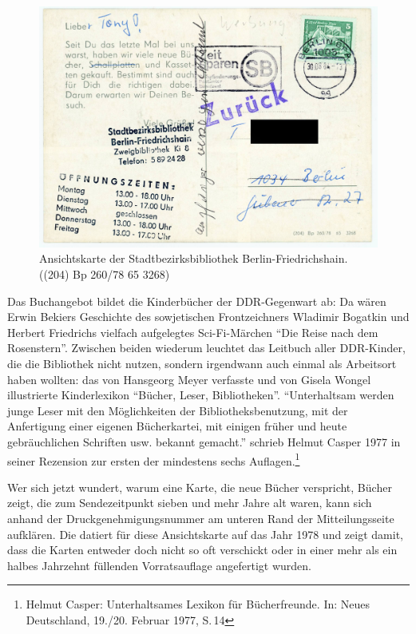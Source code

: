 \documentclass[a4paper,
fontsize=11pt,
oneside,
numbers=noperiodatend,
parskip=half-,
bibliography=totoc,
final
]{scrartcl}
\begin{document}
\begin{figure}
\centering
\includegraphics{img/abb2.jpg}
\caption{Ansichtskarte der Stadtbezirksbibliothek Berlin-Friedrichshain.
((204) Bp 260/78 65 3268)}
\end{figure}

Das Buchangebot bildet die Kinderbücher der DDR-Gegenwart ab: Da wären
Erwin Bekiers Geschichte des sowjetischen Frontzeichners Wladimir
Bogatkin und Herbert Friedrichs vielfach aufgelegtes Sci-Fi-Märchen
\enquote{Die Reise nach dem Rosenstern}. Zwischen beiden wiederum
leuchtet das Leitbuch aller DDR-Kinder, die die Bibliothek nicht nutzen,
sondern irgendwann auch einmal als Arbeitsort haben wollten: das von
Hansgeorg Meyer verfasste und von Gisela Wongel illustrierte
Kinderlexikon \enquote{Bücher, Leser, Bibliotheken}.
\enquote{Unterhaltsam werden junge Leser mit den Möglichkeiten der
Bibliotheksbenutzung, mit der Anfertigung einer eigenen Bücherkartei,
mit einigen früher und heute gebräuchlichen Schriften usw. bekannt
gemacht.} schrieb Helmut Casper 1977 in seiner Rezension zur ersten der
mindestens sechs Auflagen.\footnote{Helmut Casper: Unterhaltsames
  Lexikon für Bücherfreunde. In: Neues Deutschland, 19./20. Februar
  1977, S.\,14}

Wer sich jetzt wundert, warum eine Karte, die neue Bücher verspricht,
Bücher zeigt, die zum Sendezeitpunkt sieben und mehr Jahre alt waren,
kann sich anhand der Druckgenehmigungsnummer am unteren Rand der
Mitteilungsseite aufklären. Die datiert für diese Ansichtskarte auf das
Jahr 1978 und zeigt damit, dass die Karten entweder doch nicht so oft
verschickt oder in einer mehr als ein halbes Jahrzehnt füllenden
Vorratsauflage angefertigt wurden.
\end{document}
